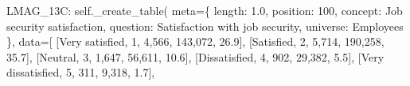 \documentclass[
  11pt,
  a4paper,
]{article}
\newenvironment{Shaded}{\begin{snugshade}}{\end{snugshade}}
\newcommand{\NormalTok}[1]{\textcolor[rgb]{0.00,0.23,0.31}{#1}}
\newcommand{\OperatorTok}[1]{\textcolor[rgb]{0.37,0.37,0.37}{#1}}
\newcommand{\StringTok}[1]{\textcolor[rgb]{0.13,0.47,0.30}{#1}}
\newcommand{\VariableTok}[1]{\textcolor[rgb]{0.07,0.07,0.07}{#1}}
\begin{document}
\begin{Shaded}
\begin{Highlighting}[]
    \StringTok{\textquotesingle{}LMAG\_13C\textquotesingle{}}\NormalTok{: }\VariableTok{self}\NormalTok{.\_create\_table(}
\NormalTok{        meta}\OperatorTok{=}\NormalTok{\{}
            \StringTok{\textquotesingle{}length\textquotesingle{}}\NormalTok{: }\StringTok{\textquotesingle{}1.0\textquotesingle{}}\NormalTok{, }\StringTok{\textquotesingle{}position\textquotesingle{}}\NormalTok{: }\StringTok{\textquotesingle{}100\textquotesingle{}}\NormalTok{,}
            \StringTok{\textquotesingle{}concept\textquotesingle{}}\NormalTok{: }\StringTok{\textquotesingle{}Job security satisfaction\textquotesingle{}}\NormalTok{,}
            \StringTok{\textquotesingle{}question\textquotesingle{}}\NormalTok{: }\StringTok{\textquotesingle{}Satisfaction with job security\textquotesingle{}}\NormalTok{,}
            \StringTok{\textquotesingle{}universe\textquotesingle{}}\NormalTok{: }\StringTok{\textquotesingle{}Employees\textquotesingle{}}
\NormalTok{        \},}
\NormalTok{        data}\OperatorTok{=}\NormalTok{[}
\NormalTok{            [}\StringTok{\textquotesingle{}Very satisfied\textquotesingle{}}\NormalTok{, }\StringTok{\textquotesingle{}1\textquotesingle{}}\NormalTok{, }\StringTok{\textquotesingle{}4,566\textquotesingle{}}\NormalTok{, }\StringTok{\textquotesingle{}143,072\textquotesingle{}}\NormalTok{, }\StringTok{\textquotesingle{}26.9\textquotesingle{}}\NormalTok{],}
\NormalTok{            [}\StringTok{\textquotesingle{}Satisfied\textquotesingle{}}\NormalTok{, }\StringTok{\textquotesingle{}2\textquotesingle{}}\NormalTok{, }\StringTok{\textquotesingle{}5,714\textquotesingle{}}\NormalTok{, }\StringTok{\textquotesingle{}190,258\textquotesingle{}}\NormalTok{, }\StringTok{\textquotesingle{}35.7\textquotesingle{}}\NormalTok{],}
\NormalTok{            [}\StringTok{\textquotesingle{}Neutral\textquotesingle{}}\NormalTok{, }\StringTok{\textquotesingle{}3\textquotesingle{}}\NormalTok{, }\StringTok{\textquotesingle{}1,647\textquotesingle{}}\NormalTok{, }\StringTok{\textquotesingle{}56,611\textquotesingle{}}\NormalTok{, }\StringTok{\textquotesingle{}10.6\textquotesingle{}}\NormalTok{],}
\NormalTok{            [}\StringTok{\textquotesingle{}Dissatisfied\textquotesingle{}}\NormalTok{, }\StringTok{\textquotesingle{}4\textquotesingle{}}\NormalTok{, }\StringTok{\textquotesingle{}902\textquotesingle{}}\NormalTok{, }\StringTok{\textquotesingle{}29,382\textquotesingle{}}\NormalTok{, }\StringTok{\textquotesingle{}5.5\textquotesingle{}}\NormalTok{],}
\NormalTok{            [}\StringTok{\textquotesingle{}Very dissatisfied\textquotesingle{}}\NormalTok{, }\StringTok{\textquotesingle{}5\textquotesingle{}}\NormalTok{, }\StringTok{\textquotesingle{}311\textquotesingle{}}\NormalTok{, }\StringTok{\textquotesingle{}9,318\textquotesingle{}}\NormalTok{, }\StringTok{\textquotesingle{}1.7\textquotesingle{}}\NormalTok{],}

\end{Highlighting}
\end{Shaded}
\end{document}
